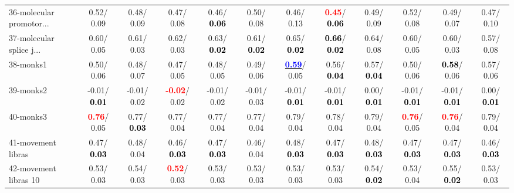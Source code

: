 \begin{table}[h]
\begin{center}
{\begin{tabular}{lc|c|c|c|c|c|c|c|c|c|c}
36-molecular promotor... &   0.52/  0.09 &   0.48/  0.09 &   0.47/  0.08 &   0.46/\textcolor{black}{\textbf{  0.06}} &   0.50/  0.08 &   0.46/  0.13 & \textcolor{red}{\textbf{  0.45}}/\textcolor{black}{\textbf{  0.06}} &   0.49/  0.09 &   0.52/  0.08 &   0.49/  0.07 &   0.47/  0.10 \\
37-molecular splice j... &   0.60/  0.05 &   0.61/  0.03 &   0.62/  0.03 &   0.63/\textcolor{black}{\textbf{  0.02}} &   0.61/\textcolor{black}{\textbf{  0.02}} &   0.65/\textcolor{black}{\textbf{  0.02}} & \textcolor{black}{\textbf{  0.66}}/\textcolor{black}{\textbf{  0.02}} &   0.64/  0.08 &   0.60/  0.05 &   0.60/  0.03 &   0.57/  0.08 \\
38-monks1 &   0.50/  0.06 &   0.48/  0.07 &   0.47/  0.05 &   0.48/  0.05 &   0.49/  0.06 & \underline{\textcolor{blue}{\textbf{  0.59}}}/  0.05 &   0.56/\textcolor{black}{\textbf{  0.04}} &   0.57/\textcolor{black}{\textbf{  0.04}} &   0.50/  0.06 & \textcolor{black}{\textbf{  0.58}}/  0.06 &   0.57/  0.06 \\
39-monks2 &  -0.01/\textcolor{black}{\textbf{  0.01}} &  -0.01/  0.02 & \textcolor{red}{\textbf{ -0.02}}/  0.02 &  -0.01/  0.02 &  -0.01/  0.03 &  -0.01/\textcolor{black}{\textbf{  0.01}} &  -0.01/\textcolor{black}{\textbf{  0.01}} &   0.00/\textcolor{black}{\textbf{  0.01}} &  -0.01/\textcolor{black}{\textbf{  0.01}} &  -0.01/\textcolor{black}{\textbf{  0.01}} &   0.00/\textcolor{black}{\textbf{  0.01}} \\ \hline
40-monks3 & \textcolor{red}{\textbf{  0.76}}/  0.05 &   0.77/\textcolor{black}{\textbf{  0.03}} &   0.77/  0.04 &   0.77/  0.04 &   0.77/  0.04 &   0.79/  0.04 &   0.78/  0.04 &   0.79/  0.04 & \textcolor{red}{\textbf{  0.76}}/  0.05 & \textcolor{red}{\textbf{  0.76}}/  0.04 &   0.79/  0.04 \\
41-movement libras &   0.47/\textcolor{black}{\textbf{  0.03}} &   0.48/  0.04 &   0.46/\textcolor{black}{\textbf{  0.03}} &   0.47/\textcolor{black}{\textbf{  0.03}} &   0.46/  0.04 &   0.48/\textcolor{black}{\textbf{  0.03}} &   0.47/\textcolor{black}{\textbf{  0.03}} &   0.48/\textcolor{black}{\textbf{  0.03}} &   0.47/\textcolor{black}{\textbf{  0.03}} &   0.47/\textcolor{black}{\textbf{  0.03}} &   0.46/\textcolor{black}{\textbf{  0.03}} \\
42-movement libras 10 &   0.53/  0.03 &   0.54/  0.03 & \textcolor{red}{\textbf{  0.52}}/  0.03 &   0.53/  0.03 &   0.53/  0.03 &   0.53/  0.03 &   0.53/  0.03 &   0.54/\textcolor{black}{\textbf{  0.02}} &   0.53/  0.04 &   0.55/\textcolor{black}{\textbf{  0.02}} &   0.53/  0.03 \\

\end{tabular}}
\end{center}
\end{table}
